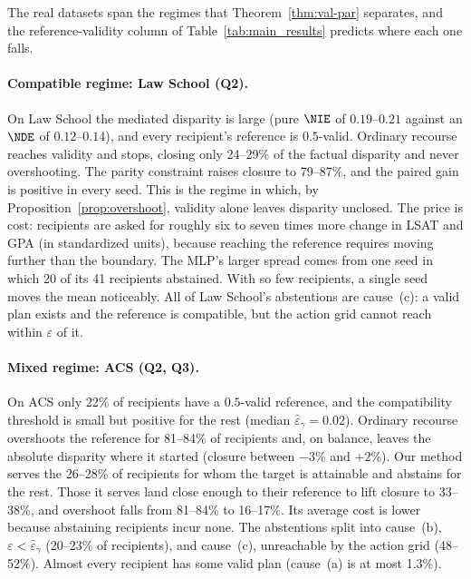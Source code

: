 The real datasets span the regimes that Theorem~\ref{thm:val-par}
separates, and the reference-validity column of Table~\ref{tab:main_results}
predicts where each one falls.

\paragraph{Compatible regime: Law School (Q2).}
On Law School the mediated disparity is large (pure $\NIE$ of $0.19$--$0.21$
against an $\NDE$ of $0.12$--$0.14$), and every recipient's reference is
$0.5$-valid. Ordinary recourse reaches validity and stops, closing only
24--29\% of the factual disparity and never overshooting. The parity
constraint raises closure to 79--87\%, and the paired gain is positive in
every seed. This is the regime in which, by
Proposition~\ref{prop:overshoot}, validity alone leaves disparity unclosed.
The price is cost: recipients are asked for roughly six to seven times more
change in LSAT and GPA (in standardized units), because reaching the
reference requires moving further than the boundary. The MLP's larger spread
comes from one seed in which 20 of its 41 recipients abstained. With so few
recipients, a single seed moves the mean noticeably. All of Law School's
abstentions are cause~(c): a valid plan exists and the reference is
compatible, but the action grid cannot reach within $\varepsilon$ of it.

\paragraph{Mixed regime: ACS (Q2, Q3).}
On ACS only 22\% of recipients have a $0.5$-valid reference, and the
compatibility threshold is small but positive for the rest (median
$\hat\varepsilon_\gamma=0.02$). Ordinary recourse overshoots the reference
for 81--84\% of recipients and, on balance, leaves the absolute disparity
where it started (closure between $-3$\% and $+2$\%). Our method serves the
26--28\% of
recipients for whom the target is attainable and abstains for the rest. Those
it serves land close enough to their reference to lift closure to 33--38\%,
and overshoot falls from 81--84\% to 16--17\%. Its average cost is lower
because abstaining recipients incur none.
The abstentions split into cause~(b), $\varepsilon<\hat\varepsilon_\gamma$
(20--23\% of recipients), and cause~(c), unreachable by the action grid
(48--52\%). Almost every recipient has some valid plan (cause~(a) is at
most 1.3\%).

